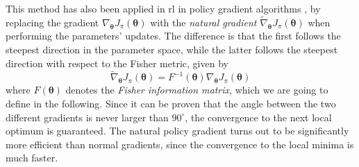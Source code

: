 This method has also been applied in \acrshort{rl} in policy gradient algorithms \cite{Peters2008}, by replacing the gradient $\nabla_{\boldsymbol \theta} J_\pi(\boldsymbol \theta)$ with the \emph{natural gradient} $\widetilde \nabla_{\boldsymbol \theta} J_\pi(\boldsymbol \theta)$ when performing the parameters' updates. The difference is that the first follows the steepest direction in the parameter space, while the latter follows the steepest direction with respect to the Fisher metric, given by
\begin{equation}
    \widetilde \nabla_{\boldsymbol \theta} J_\pi(\boldsymbol \theta) = F^{-1}(\boldsymbol \theta) \nabla_{\boldsymbol \theta} J_\pi(\boldsymbol \theta)
    \label{eq:natgradJ}
\end{equation}
where $F(\boldsymbol \theta)$ denotes the \emph{Fisher information matrix}, which we are going to define in the following. Since it can be proven that the angle between the two different gradients is never larger than $90^\circ$, the convergence to the next local optimum is guaranteed. The natural policy gradient turns out to be significantly more efficient than normal gradients, since the convergence to the local minima is much faster.

